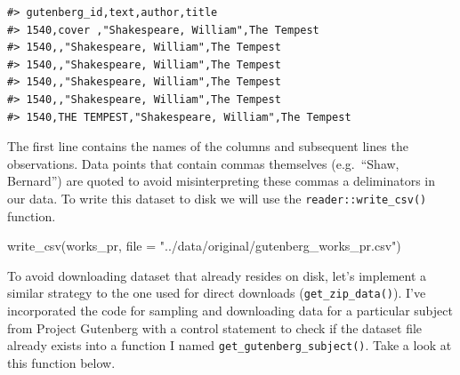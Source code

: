\documentclass[
  letterpaper,
]{latex/krantz}
\newenvironment{Shaded}{\begin{snugshade}}{\end{snugshade}}
\newcommand{\AttributeTok}[1]{\textcolor[rgb]{0.40,0.45,0.13}{#1}}
\newcommand{\FunctionTok}[1]{\textcolor[rgb]{0.28,0.35,0.67}{#1}}
\newcommand{\NormalTok}[1]{\textcolor[rgb]{0.00,0.23,0.31}{#1}}
\newcommand{\StringTok}[1]{\textcolor[rgb]{0.13,0.47,0.30}{#1}}
\begin{document}
\begin{verbatim}
#> gutenberg_id,text,author,title
#> 1540,cover ,"Shakespeare, William",The Tempest
#> 1540,,"Shakespeare, William",The Tempest
#> 1540,,"Shakespeare, William",The Tempest
#> 1540,,"Shakespeare, William",The Tempest
#> 1540,,"Shakespeare, William",The Tempest
#> 1540,THE TEMPEST,"Shakespeare, William",The Tempest
\end{verbatim}

The first line contains the names of the columns and subsequent lines
the observations. Data points that contain commas themselves
(e.g.~``Shaw, Bernard'') are quoted to avoid misinterpreting these
commas a deliminators in our data. To write this dataset to disk we will
use the \texttt{reader::write\_csv()} function.

\begin{Shaded}
\begin{Highlighting}[]
\FunctionTok{write\_csv}\NormalTok{(works\_pr, }\AttributeTok{file =} \StringTok{"../data/original/gutenberg\_works\_pr.csv"}\NormalTok{)}
\end{Highlighting}
\end{Shaded}

To avoid downloading dataset that already resides on disk, let's
implement a similar strategy to the one used for direct downloads
(\texttt{get\_zip\_data()}). I've incorporated the code for sampling and
downloading data for a particular subject from Project Gutenberg with a
control statement to check if the dataset file already exists into a
function I named \texttt{get\_gutenberg\_subject()}. Take a look at this
function below.
\end{document}

